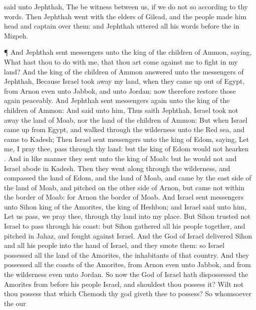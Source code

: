 {said unto
Jephthah, The
{} be
witness between us, if we
do not so according to thy
words.
Then
Jephthah
went with the
elders of
Gilead, and the
people
made him
head and
captain over them: and
Jephthah
uttered all his
words
before the
{} in
Mizpeh.
\par }{\PP {}¶ And
Jephthah
sent
messengers unto the
king of the
children of
Ammon,
saying, What hast thou to do with me, that thou art
come against me to
fight in my
land?
And the
king of the
children of
Ammon
answered unto the
messengers of
Jephthah, Because
Israel took
away my
land, when they came
up out of
Egypt, from
Arnon even unto
Jabbok, and unto
Jordan: now therefore restore those
{}
again
peaceably.
And
Jephthah
sent
messengers
again unto the
king of the
children of
Ammon:
And
said unto him, Thus
saith
Jephthah,
Israel took not
away the
land of
Moab, nor the
land of the
children of
Ammon:
But when
Israel came
up from
Egypt, and
walked through the
wilderness unto the
Red
sea, and
came to
Kadesh;
Then
Israel
sent
messengers unto the
king of
Edom,
saying, Let me, I pray thee, pass
through thy
land: but the
king of
Edom would not
hearken
{}. And in like manner they
sent unto the
king of
Moab: but he
would not
{} and
Israel
abode in
Kadesh.
Then they went
along through the
wilderness, and
compassed the
land of
Edom, and the
land of
Moab, and
came by the east
side of the
land of
Moab, and
pitched on the other
side of
Arnon, but
came not within the
border of
Moab: for
Arnon
{} the
border of
Moab.
And
Israel
sent
messengers unto
Sihon
king of the
Amorites, the
king of
Heshbon; and
Israel
said unto him, Let us
pass, we pray thee, through thy
land
into my
place.
But
Sihon
trusted not
Israel to
pass through his
coast: but
Sihon
gathered all his
people
together, and
pitched in
Jahaz, and
fought against
Israel.
And the
{}
God of
Israel
delivered
Sihon and all his
people into the
hand of
Israel, and they
smote them: so
Israel
possessed all the
land of the
Amorites, the
inhabitants of that
country.
And they
possessed all the
coasts of the
Amorites, from
Arnon even unto
Jabbok, and from the
wilderness even unto
Jordan.
So now the
{}
God of
Israel hath
dispossessed the
Amorites from
before his
people
Israel, and shouldest thou
possess it?
Wilt not thou
possess that which
Chemosh thy
god giveth thee to
possess? So whomsoever the
{} our
}

